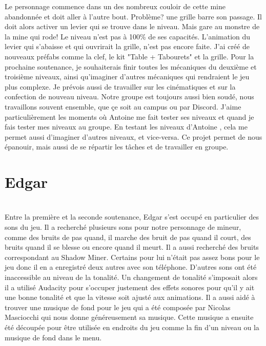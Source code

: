 \documentclass[titlepage, 13px, a4paper]{report}
\begin{document}
Le personnage commence dans un des nombreux couloir de cette mine abandonnée et doit aller à l'autre bout. 
Problème? une grille barre son passage. Il doit alors activer un levier qui se trouve dans le niveau. 
Mais gare au monstre de la mine qui rode! 
Le niveau n'est pas à 100\% de ses capacités. L'animation du levier qui s'abaisse et qui ouvrirait la grille, n'est pas encore faite. 
J'ai créé de nouveaux préfabs comme la clef, le kit "Table + Tabourets" et la grille. Pour la prochaine soutenance, 
je souhaiterais finir toutes les mécaniques du deuxième et troisième niveaux, ainsi qu'imaginer d'autres mécaniques qui rendraient
le jeu plus complexe. Je prévois aussi de travailler sur les cinématiques et sur la confection de nouveau niveau. 
Notre groupe est toujours aussi bien soudé, nous travaillons souvent ensemble, que çe soit au campus ou par Discord. 
J'aime particulièrement les moments où Antoine me fait tester ses niveaux et quand je fais tester mes niveaux au groupe. 
En testant les niveaux d'Antoine , cela me permet aussi d'imaginer d'autres niveaux, et vice-versa. 
Ce projet permet de nous épanouir, mais aussi de se répartir les tâches et de travailler en groupe.

\newpage





\section{Edgar}
\paragraph{} \hspace{0pt} \\
Entre la première et la seconde soutenance, Edgar s’est occupé en particulier des sons du jeu. 
Il a recherché plusieurs sons pour notre personnage de mineur, comme des bruits de pas quand, il marche des bruit de pas quand il court, 
des bruits quand il se blesse ou encore quand il meurt. Il a aussi recherché des bruits correspondant au Shadow Miner. 
Certains pour lui n’était pas assez bons pour le jeu donc il en a enregistré deux autres avec son téléphone. 
D’autres sons ont été inaccessible au niveau de la tonalité. Un changement de tonalité s'imposait alors il a utilisé Audacity pour 
s’occuper justement des effets sonores pour qu’il y ait une bonne tonalité et que la vitesse soit ajusté aux animations. 
Il a aussi aidé à trouver une musique de fond pour le jeu qui a été composée par Nicolas Masciocchi 
qui nous donne généreusement sa musique. Cette musique a ensuite été découpée pour être utilisée en endroits du jeu
comme la fin d’un niveau ou la musique de fond dans le menu. 
\end{document}
